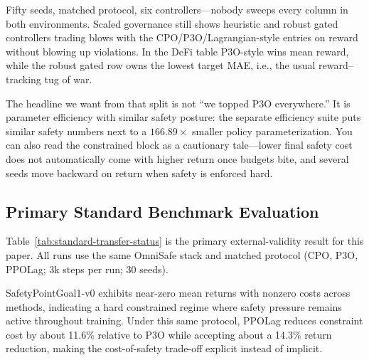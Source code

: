 \begin{table}[htbp]
\centering

\caption{Governance controller comparison under the 50-seed matched protocol across scaled and DeFi environments: Random, Heuristic, CPO-style, P3O-style, PPO-Lagrangian-style, and Robust QGate+Shield. Reward values in this table are protocol-specific and not numerically comparable to ablation or efficiency-suite reward scales.}
\label{tab:constrained-baselines}
\end{table}

Fifty seeds, matched protocol, six controllers---nobody sweeps every column in both environments. Scaled governance still shows heuristic and robust gated controllers trading blows with the CPO/P3O/Lagrangian-style entries on reward without blowing up violations. In the DeFi table P3O-style wins mean reward, while the robust gated row owns the lowest target MAE, i.e., the usual reward--tracking tug of war.

The headline we want from that split is not ``we topped P3O everywhere.'' It is parameter efficiency with similar safety posture: the separate efficiency suite puts similar safety numbers next to a $166.89\times$ smaller policy parameterization. You can also read the constrained block as a cautionary tale---lower final safety cost does not automatically come with higher return once budgets bite, and several seeds move backward on return when safety is enforced hard.

\subsection{Primary Standard Benchmark Evaluation}

\begin{table}[htbp]
\centering

\caption{Completed 30-seed constrained benchmark runs on this host (SafetyPointGoal1-v0, SafetyHalfCheetahVelocity-v1).}
\label{tab:standard-transfer-status}
\end{table}

Table~\ref{tab:standard-transfer-status} is the primary external-validity result for this paper. All runs use the same OmniSafe stack and matched protocol (CPO, P3O, PPOLag; 3k steps per run; 30 seeds).

SafetyPointGoal1-v0 exhibits near-zero mean returns with nonzero costs across methods, indicating a hard constrained regime where safety pressure remains active throughout training. Under this same protocol, PPOLag reduces constraint cost by about 11.6\% relative to P3O while accepting about a 14.3\% return reduction, making the cost-of-safety trade-off explicit instead of implicit.

